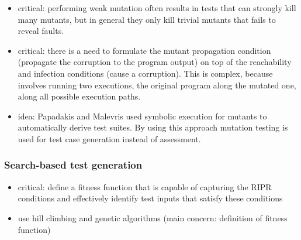 \begin{itemize}
	\item critical: performing weak mutation often results in tests that can strongly kill many mutants, but in general they only kill trivial mutants that fails to reveal faults.
	
	\item critical: there is a need to formulate the mutant propagation condition (propagate the corruption to the program output) on top of the reachability and infection conditions (cause a corruption). This is complex, because involves running two executions, the original program along the mutated one, along all possible execution paths.

	\item idea: Papadakis and Malevris \cite{papadakis2010automatic} used symbolic execution for mutants to automatically derive test suites. By using this approach mutation testing is used for test case generation instead of assessment.

\end{itemize}

\subsubsection{Search-based test generation} %

\begin{itemize}
	\item critical: define a fitness function that is capable of capturing the RIPR conditions and effectively identify test inputs that satisfy these conditions
	\item use hill climbing and genetic algorithms (main concern: definition of fitness function) 
\end{itemize}

